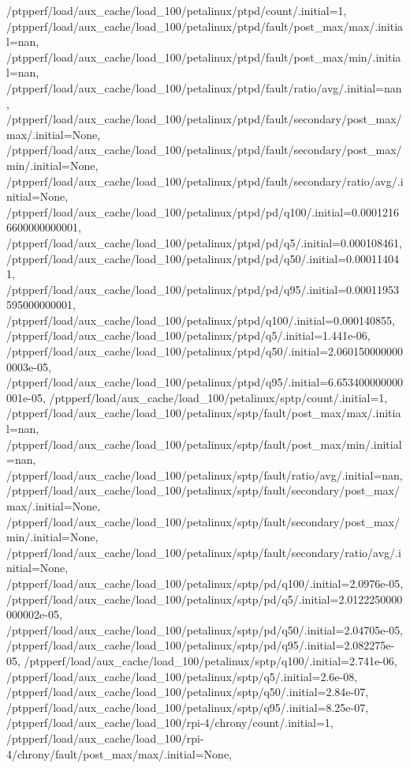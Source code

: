 {    /ptpperf/load/aux_cache/load_100/petalinux/ptpd/count/.initial=1,
    /ptpperf/load/aux_cache/load_100/petalinux/ptpd/fault/post_max/max/.initial=nan,
    /ptpperf/load/aux_cache/load_100/petalinux/ptpd/fault/post_max/min/.initial=nan,
    /ptpperf/load/aux_cache/load_100/petalinux/ptpd/fault/ratio/avg/.initial=nan,
    /ptpperf/load/aux_cache/load_100/petalinux/ptpd/fault/secondary/post_max/max/.initial=None,
    /ptpperf/load/aux_cache/load_100/petalinux/ptpd/fault/secondary/post_max/min/.initial=None,
    /ptpperf/load/aux_cache/load_100/petalinux/ptpd/fault/secondary/ratio/avg/.initial=None,
    /ptpperf/load/aux_cache/load_100/petalinux/ptpd/pd/q100/.initial=0.00012166600000000001,
    /ptpperf/load/aux_cache/load_100/petalinux/ptpd/pd/q5/.initial=0.000108461,
    /ptpperf/load/aux_cache/load_100/petalinux/ptpd/pd/q50/.initial=0.000114041,
    /ptpperf/load/aux_cache/load_100/petalinux/ptpd/pd/q95/.initial=0.00011953595000000001,
    /ptpperf/load/aux_cache/load_100/petalinux/ptpd/q100/.initial=0.000140855,
    /ptpperf/load/aux_cache/load_100/petalinux/ptpd/q5/.initial=1.441e-06,
    /ptpperf/load/aux_cache/load_100/petalinux/ptpd/q50/.initial=2.0601500000000003e-05,
    /ptpperf/load/aux_cache/load_100/petalinux/ptpd/q95/.initial=6.653400000000001e-05,
    /ptpperf/load/aux_cache/load_100/petalinux/sptp/count/.initial=1,
    /ptpperf/load/aux_cache/load_100/petalinux/sptp/fault/post_max/max/.initial=nan,
    /ptpperf/load/aux_cache/load_100/petalinux/sptp/fault/post_max/min/.initial=nan,
    /ptpperf/load/aux_cache/load_100/petalinux/sptp/fault/ratio/avg/.initial=nan,
    /ptpperf/load/aux_cache/load_100/petalinux/sptp/fault/secondary/post_max/max/.initial=None,
    /ptpperf/load/aux_cache/load_100/petalinux/sptp/fault/secondary/post_max/min/.initial=None,
    /ptpperf/load/aux_cache/load_100/petalinux/sptp/fault/secondary/ratio/avg/.initial=None,
    /ptpperf/load/aux_cache/load_100/petalinux/sptp/pd/q100/.initial=2.0976e-05,
    /ptpperf/load/aux_cache/load_100/petalinux/sptp/pd/q5/.initial=2.0122250000000002e-05,
    /ptpperf/load/aux_cache/load_100/petalinux/sptp/pd/q50/.initial=2.04705e-05,
    /ptpperf/load/aux_cache/load_100/petalinux/sptp/pd/q95/.initial=2.082275e-05,
    /ptpperf/load/aux_cache/load_100/petalinux/sptp/q100/.initial=2.741e-06,
    /ptpperf/load/aux_cache/load_100/petalinux/sptp/q5/.initial=2.6e-08,
    /ptpperf/load/aux_cache/load_100/petalinux/sptp/q50/.initial=2.84e-07,
    /ptpperf/load/aux_cache/load_100/petalinux/sptp/q95/.initial=8.25e-07,
    /ptpperf/load/aux_cache/load_100/rpi-4/chrony/count/.initial=1,
    /ptpperf/load/aux_cache/load_100/rpi-4/chrony/fault/post_max/max/.initial=None,
}
